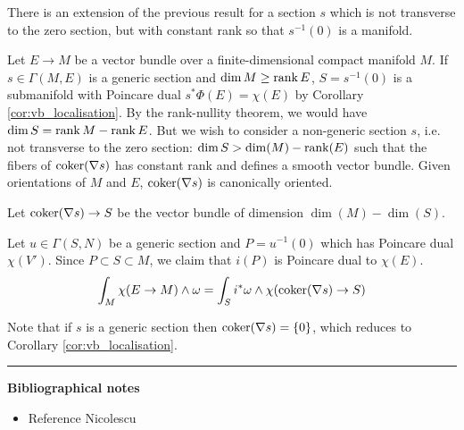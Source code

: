 There is an extension of the previous result for a section $s$ which is not
transverse to the zero section, but with constant rank so that $s^{-1}(0)$ is a
manifold. 

Let $E\to M$ be a vector bundle over a finite-dimensional compact manifold  $M$.
If $s\in\Gamma(M,E)$ is a generic section and $\dim M \geq \operatorname{rank} E$, 
$S=s^{-1}(0)$ is a submanifold with
Poincare dual $s^*\Phi(E)=\chi(E)$ by Corollary \ref{cor:vb_localisation}. 
By the rank-nullity theorem, we would have $\dim S = \operatorname{rank} M - \operatorname{rank} E$. But 
we wish to consider a non-generic section $s$, i.e. not transverse to the zero
section: $\dim S > \dim(M)-\operatorname{rank}(E)$ such that the fibers of $\operatorname{coker}(\nabla s)$
has constant rank and defines a smooth vector bundle. Given orientations of  $M$
and  $E$,  $\operatorname{coker}(\nabla s)$ is canonically oriented.

\begin{thm}
	Let  $\operatorname{coker}(\nabla s) \to S$ be the vector bundle of dimension
	$\dim(M)-\dim(S)$.  

	Let  $u\in\Gamma(S,N)$ be a generic section and
	$P=u^{-1}(0)$ which has Poincare dual $\chi(V')$. Since  $P\subset S \subset M$,
	we claim that $i(P)$ is Poincare dual to  $\chi(E)$.
\[
\int_M \chi(E\to M)\wedge \omega 
= \int_{S} i^*\omega \wedge \chi(\operatorname{coker}(\nabla s)\to S)
\]
\end{thm}

 
Note that if $s$ is a generic section then  $\operatorname{coker} (\nabla s) = \{0\}$, which
reduces to Corollary \ref{cor:vb_localisation}.


\vspace{5mm}
\hrule 
\vspace{5mm}

\textbf{Bibliographical notes}
{\small
\begin{itemize}
	\item Reference Nicolescu
\end{itemize}
}
